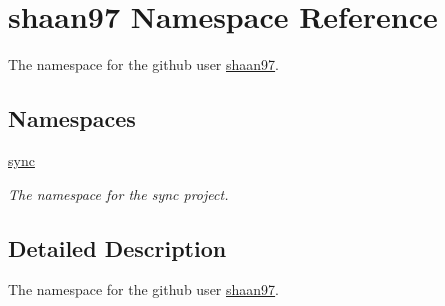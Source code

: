 \hypertarget{namespaceshaan97}{}\section{shaan97 Namespace Reference}
\label{namespaceshaan97}


The namespace for the github user \hyperlink{namespaceshaan97}{shaan97}.  


\subsection*{Namespaces}
\begin{DoxyCompactItemize}
\item 
 \hyperlink{namespaceshaan97_1_1sync}{sync}
\begin{DoxyCompactList}\small\item\em The namespace for the sync project. \end{DoxyCompactList}\end{DoxyCompactItemize}


\subsection{Detailed Description}
The namespace for the github user \hyperlink{namespaceshaan97}{shaan97}. 